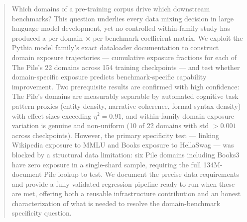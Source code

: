 \begin{abstract}
Which domains of a pre-training corpus drive which downstream benchmarks? This question underlies every data mixing decision in large language model development, yet no controlled within-family study has produced a per-domain $\times$ per-benchmark coefficient matrix. We exploit the Pythia model family's exact dataloader documentation to construct domain exposure trajectories --- cumulative exposure fractions for each of The Pile's 22 domains across 154 training checkpoints --- and test whether domain-specific exposure predicts benchmark-specific capability improvement. Two prerequisite results are confirmed with high confidence: The Pile's domains are measurably separable by automated cognitive task pattern proxies (entity density, narrative coherence, formal syntax density) with effect sizes exceeding $\eta^2 = 0.91$, and within-family domain exposure variation is genuine and non-uniform (10 of 22 domains with std $> 0.001$ across checkpoints). However, the primary specificity test --- linking Wikipedia exposure to MMLU and Books exposure to HellaSwag --- was blocked by a structural data limitation: six Pile domains including Books3 have zero exposure in a single-shard sample, requiring the full 134M-document Pile lookup to test. We document the precise data requirements and provide a fully validated regression pipeline ready to run when these are met, offering both a reusable infrastructure contribution and an honest characterization of what is needed to resolve the domain-benchmark specificity question.
\end{abstract}
